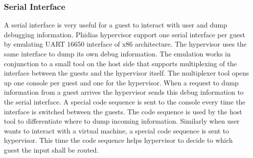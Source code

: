 \subsubsection{Serial Interface}
A serial interface is very useful for a guest to interact with user and dump debugging information.
Phidias hypervisor support one serial interface per guest by emulating UART 16650 interface of x86 architecture.
The hypervisor uses the same interface to dump its own debug information. 
The emulation works in conjunction to a small tool on the host side that supports multiplexing of the interface between the guests and the hypervisor itself.
The multiplexer tool opens up one console per guest and one for the hypervisor. When a request to dump information from a guest arrives the hypervisor
sends this debug information to the serial interface. A special code sequence is sent to the console every time the interface is switched between the guests.
The code sequence is used by the host tool to differentiate where to dump incoming information. 
Similarly when user wants to interact with a virtual machine, a special code sequence is sent to hypervisor.
This time the code sequence helps hypervisor to decide to which guest the input shall be routed. 
